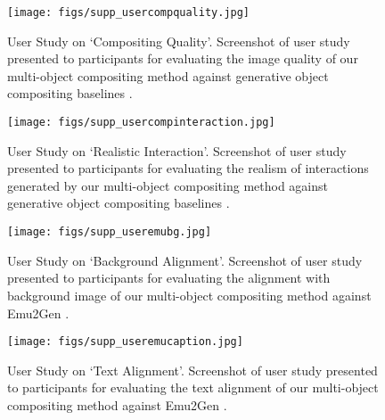 
\begin{figure}[t]
    \centering
    \texttt{[image: figs/supp\_usercompquality.jpg]}
    \caption{User Study on `Compositing Quality'. Screenshot of user study presented to participants for evaluating the image quality of our multi-object compositing method against generative object compositing baselines \cite{yang2023paintbyexample,zhang2023controlcom,chen2023anydoor,song2024imprint,tarres2024thinking}.}

    \label{fig:supp_userquality}
\end{figure}

\begin{figure}[t]
    \centering
    \texttt{[image: figs/supp\_usercompinteraction.jpg]}
    \caption{User Study on `Realistic Interaction'. Screenshot of user study presented to participants for evaluating the realism of interactions generated by our multi-object compositing method against generative object compositing baselines \cite{yang2023paintbyexample,zhang2023controlcom,chen2023anydoor,song2024imprint,tarres2024thinking}.}

    \label{fig:supp_userinteraction}
\end{figure}


\begin{figure}[t]
    \centering
    \texttt{[image: figs/supp\_useremubg.jpg]}
    \caption{User Study on `Background Alignment'. Screenshot of user study presented to participants for evaluating the alignment with background image of our multi-object compositing method against Emu2Gen \cite{sun2024emugen}.}

    \label{fig:supp_userbg}
\end{figure}

\begin{figure}[t]
    \centering
    \texttt{[image: figs/supp\_useremucaption.jpg]}
    \caption{User Study on `Text Alignment'. Screenshot of user study presented to participants for evaluating the text alignment of our multi-object compositing method against Emu2Gen \cite{sun2024emugen}.}

    \label{fig:supp_usercaption}
\end{figure}


